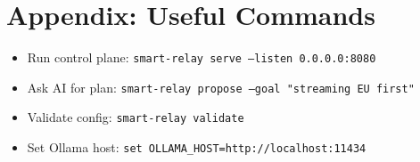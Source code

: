 \chapter{Appendix: Useful Commands}

\begin{itemize}
    \item Run control plane: \texttt{smart-relay serve --listen 0.0.0.0:8080}
    \item Ask AI for plan: \texttt{smart-relay propose --goal "streaming EU first"}
    \item Validate config: \texttt{smart-relay validate}
    \item Set Ollama host: \texttt{set OLLAMA\_HOST=http://localhost:11434}
\end{itemize}

